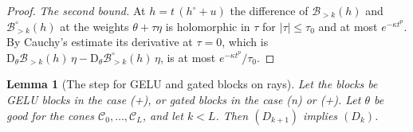 \documentclass[10pt]{article}
\newtheorem{lemma}[theorem]{Lemma}
\theoremstyle{definition}
\theoremstyle{remark}
\newcommand{\Der}{\mathrm{D}}
\begin{document}
\begin{proof}
\emph{The second bound.} At $h = t\,(h^\circ + u)$ the difference of $\mathcal B_{>k}(h)$ and $\mathcal B^\circ_{>k}(h)$ at the weights $\theta + \tau\eta$ is holomorphic in $\tau$ for $\lvert\tau\rvert \le \tau_0$ and at most $e^{-\kappa t^p}$. By Cauchy's estimate its derivative at $\tau = 0$, which is $\Der_\theta\mathcal B_{>k}(h)\,\eta - \Der_\theta\mathcal B^\circ_{>k}(h)\,\eta$, is at most $e^{-\kappa t^p}/\tau_0$.
\end{proof}

\begin{lemma}[The step for GELU and gated blocks on rays]\label{lem:gtstep}
Let the blocks be GELU blocks in the case (+), or gated blocks in the case (n) or (+). Let $\theta$ be good for the cones $\mathcal C_0, \dots, \mathcal C_L$, and let $k < L$. Then $(D_{k+1})$ implies $(D_k)$.
\end{lemma}
\end{document}
